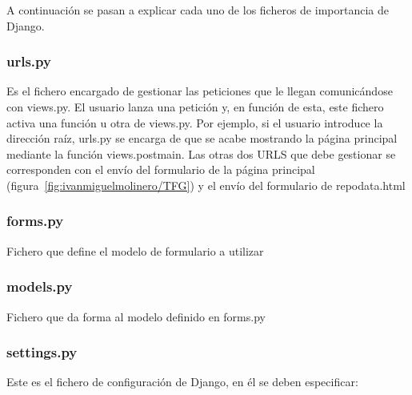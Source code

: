 \documentclass[a4paper, 12pt]{book}
\begin{document}
A continuación se pasan a explicar cada uno de los ficheros de importancia de Django.

\subsubsection{urls.py}

Es el fichero encargado de gestionar las peticiones que le llegan comunicándose con views.py. El usuario lanza una petición y, en función de esta, este fichero activa una función u otra de views.py. Por ejemplo, si el usuario introduce la dirección raíz, urls.py se encarga de que se acabe mostrando la página principal mediante la función views.post\textunderscore main. Las otras dos URLS que debe gestionar se corresponden con el envío del formulario de la página principal (figura~\ref{fig:ivanmiguelmolinero/TFG}) y el envío del formulario de repo\textunderscore data.html

\subsubsection{forms.py}

Fichero que define el modelo de formulario a utilizar

\subsubsection{models.py}

Fichero que da forma al modelo definido en forms.py

\subsubsection{settings.py}

Este es el fichero de configuración de Django, en él se deben especificar:
\end{document}

